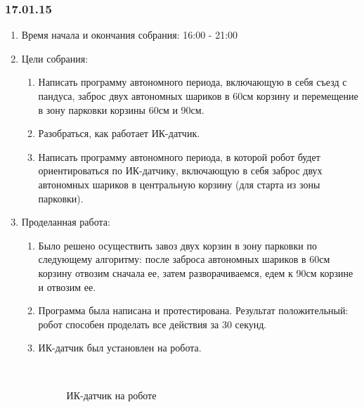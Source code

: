 \subsubsection{17.01.15}
\begin{enumerate}
	\item Время начала и окончания собрания: 16:00 - 21:00
	
	\item Цели собрания:
	\begin{enumerate}
		\item Написать программу автономного периода, включающую в себя съезд с пандуса, заброс двух автономных шариков в 60см корзину и перемещение в зону парковки корзины 60см и 90см.
		
		\item Разобраться, как работает ИК-датчик.
		
		\item Написать программу автономного периода, в которой робот будет ориентироваться по ИК-датчику, включающую в себя заброс двух автономных шариков в центральную корзину (для старта из зоны парковки).
	\end{enumerate}
	\item Проделанная работа:
	\begin{enumerate}
		\item Было решено осуществить завоз двух корзин в зону парковки по следующему алгоритму: после заброса автономных шариков в 60см корзину отвозим сначала ее, затем разворачиваемся, едем к 90см корзине и отвозим ее.
		
		\item Программа была написана и протестирована. Результат положительный: робот способен проделать все действия за 30 секунд.
		
		\item  ИК-датчик был установлен на робота.
		\begin{figure}[H]
			\begin{minipage}[h]{0.2\linewidth}
				\center  
			\end{minipage}
			\begin{minipage}[h]{0.6\linewidth}
				\caption{ИК-датчик на роботе}
			\end{minipage}
		\end{figure}
		

\end{enumerate}
\end{enumerate}
